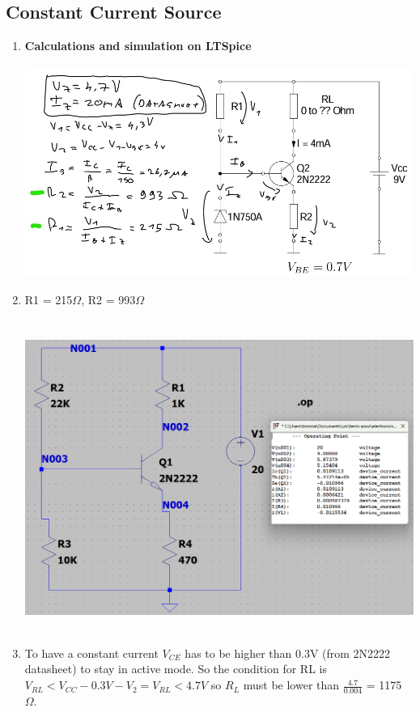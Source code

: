 \documentclass{article}
\begin{document}
	\subsection{Constant Current Source}
		\begin{enumerate}
			\item \textbf{Calculations and simulation on LTSpice}\\\\
			\includegraphics[scale=0.55]{prelab 3 ex2 calc}\\
			\item R1 = 215\(\Omega\), R2 = 993\(\Omega\)\\\\\\
			\includegraphics[scale=0.6]{prelab 3 ex1 circuit}\\\\
			\item To have a constant current \(V_{CE}\) has to be higher than 0.3V (from 2N2222 datasheet) to stay in active mode. So the condition for RL is \(V_{RL} < V_{CC}-0.3V-V_2 = V_{RL} < 4.7V\) so \(R_L\) must be lower than \(\frac{4.7}{0.004} \) = 1175 \(\Omega\).\\\\

\end{enumerate}
\end{document}
